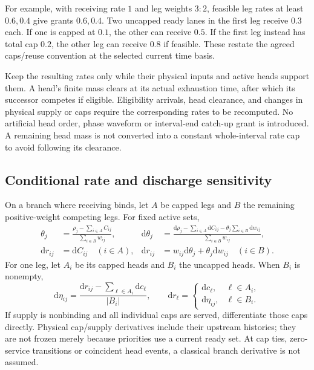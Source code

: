 \documentclass[11pt]{article}
\newcommand{\dd}{\mathrm d}
\begin{document}
For example, with receiving rate $1$ and leg weights $3:2$, feasible leg rates at least $0.6,0.4$ give grants $0.6,0.4$. Two uncapped ready lanes in the first leg receive $0.3$ each. If one is capped at $0.1$, the other can receive $0.5$. If the first leg instead has total cap $0.2$, the other leg can receive $0.8$ if feasible. These restate the agreed caps/reuse convention at the selected current time basis.

Keep the resulting rates only while their physical inputs and active heads support them. A head's finite mass clears at its actual exhaustion time, after which its successor competes if eligible. Eligibility arrivals, head clearance, and changes in physical supply or caps require the corresponding rates to be recomputed. No artificial head order, phase waveform or interval-end catch-up grant is introduced. A remaining head mass is not converted into a constant whole-interval rate cap to avoid following its clearance.

\subsection*{Conditional rate and discharge sensitivity}

On a branch where receiving binds, let $A$ be capped legs and $B$ the remaining positive-weight competing legs. For fixed active sets,
\begin{align}
 \theta_j&=\frac{\rho_j-\sum_{i\in A}C_{ij}}{\sum_{i\in B}w_{ij}},&
 \dd\theta_j&=\frac{\dd\rho_j-\sum_{i\in A}\dd C_{ij}
 -\theta_j\sum_{i\in B}\dd w_{ij}}{\sum_{i\in B}w_{ij}},
 \label{eq:ready-leg-derivative}\\
 \dd r_{ij}&=\dd C_{ij}\quad(i\in A),&
 \dd r_{ij}&=w_{ij}\dd\theta_j+\theta_j\dd w_{ij}\quad(i\in B).
 \label{eq:ready-grant-derivative}
\end{align}
For one leg, let $A_i$ be its capped heads and $B_i$ the uncapped heads. When $B_i$ is nonempty,
\begin{equation}
 \dd\eta_{ij}=\frac{\dd r_{ij}-\sum_{\ell\in A_i}\dd c_\ell}{|B_i|},
 \qquad \dd r_\ell=
 \begin{cases}\dd c_\ell,&\ell\in A_i,\\
 \dd\eta_{ij},&\ell\in B_i.
 \end{cases}
 \label{eq:ready-lane-derivative}
\end{equation}
If supply is nonbinding and all individual caps are served, differentiate those caps directly. Physical cap/supply derivatives include their upstream histories; they are not frozen merely because priorities use a current ready set. At cap ties, zero-service transitions or coincident head events, a classical branch derivative is not assumed.
\end{document}
